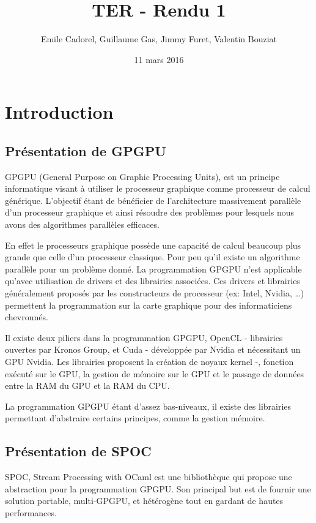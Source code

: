 \documentclass{report}
\title{TER - Rendu 1}
\author{Emile Cadorel, Guillaume Gas, Jimmy Furet, Valentin Bouziat}
\date{11 mars 2016}
\begin{document}
\maketitle

\chapter{Introduction}
\section{Présentation de GPGPU}
GPGPU (General Purpose on Graphic Processing Units), est un principe informatique visant à utiliser le processeur graphique comme processeur de calcul générique. L’objectif étant de bénéficier de l’architecture massivement parallèle d’un processeur graphique et ainsi résoudre des problèmes pour lesquels nous avons des algorithmes parallèles efficaces.\newline

En effet le processeurs graphique possède une capacité de calcul beaucoup plus grande que celle d’un processeur classique. Pour peu qu’il existe un algorithme parallèle pour un problème donné. La programmation GPGPU n’est applicable qu’avec utilisation de drivers et des librairies associées. Ces drivers et librairies généralement proposés par les constructeurs de processeur (ex: Intel, Nvidia, …) permettent la programmation sur la carte graphique pour des informaticiens chevronnés.\newline

Il existe deux piliers dans la programmation GPGPU, OpenCL - librairies ouvertes par Kronos Group, et Cuda - développée par Nvidia et nécessitant un GPU Nvidia.
Les librairies proposent la création de noyaux  kernel -, fonction exécuté sur le GPU, la gestion de mémoire sur le GPU et le passage de données entre la RAM du GPU et la RAM du CPU.\newline

La programmation GPGPU étant d’assez bas-niveaux, il existe des librairies permettant d’abstraire certains principes, comme la gestion mémoire.

\section{Présentation de SPOC}
SPOC, Stream Processing with OCaml est une bibliothèque qui propose une abstraction pour la programmation GPGPU. Son principal but est de fournir une solution portable, multi-GPGPU, et hétérogène tout en gardant de hautes performances.\newline
\end{document}
